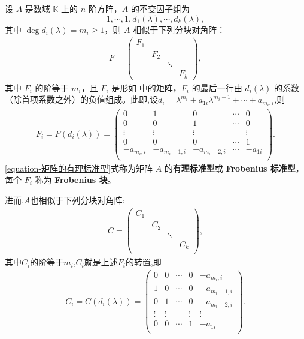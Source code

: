 \documentclass[../../main.tex]{subfiles}
\begin{document}
\begin{theorem}\label{theorem:有理标准型核心定理}
设 $A$ 是数域 $\mathbb{K}$ 上的 $n$ 阶方阵，$A$ 的不变因子组为
\[
1,\cdots,1,d_1(\lambda),\cdots,d_k(\lambda),
\]
其中 $\deg d_i(\lambda)=m_i\geqslant 1$，则 $A$ 相似于下列分块对角阵：
\begin{align}\label{equation-矩阵的有理标准型}
F = \begin{pmatrix}
F_1 & & & \\
& F_2 & & \\
& & \ddots & \\
& & & F_k
\end{pmatrix},
\end{align}
其中 $F_i$ 的阶等于 $m_i$，且 $F_i$ 是形如 中的矩阵，$F_i$ 的最后一行由 $d_i(\lambda)$ 的系数（除首项系数之外）的负值组成。此即,设$d_i=\lambda ^{m_i}+a_{1i}\lambda ^{m_i-1}+\cdots +a_{m_i,i}$,则
\begin{align*}
F_i=F(d_i(\lambda))=\left( \begin{matrix}
0&		1&		0&		\cdots&		0\\
0&		0&		1&		\cdots&		0\\
\vdots&		\vdots&		\vdots&		&		\vdots\\
0&		0&		0&		\cdots&		1\\
-a_{m_i,i}&		-a_{m_i-1,i}&		-a_{m_i-2,i}&		\cdots&		-a_{1i}\\
\end{matrix} \right) .
\end{align*}
\eqref{equation-矩阵的有理标准型}式称为矩阵 $A$ 的\textbf{有理标准型}或 \textbf{Frobenius 标准型}，每个 $F_i$ 称为 \textbf{Frobenius 块}。

进而,$A$也相似于下列分块对角阵:
\begin{align*}
C=\left( \begin{matrix}
C_1&		&		&		\\
&		C_2&		&		\\
&		&		\ddots&		\\
&		&		&		C_k\\
\end{matrix} \right) ,
\end{align*}
其中$C_i$的阶等于$m_i$,$C_i$就是上述$F_i$的转置,即
\begin{align*}
C_i=C(d_i(\lambda ))=\left( \begin{matrix}
0&		0&		\cdots&		0&		-a_{m_i,i}\\
1&		0&		\cdots&		0&		-a_{m_i-1,i}\\
0&		1&		\cdots&		0&		-a_{m_i-2,i}\\
\vdots&		\vdots&		&		\vdots&		\vdots\\
0&		0&		\cdots&		1&		-a_{1i}\\
\end{matrix} \right) .
\end{align*}
\end{theorem}
\end{document}
